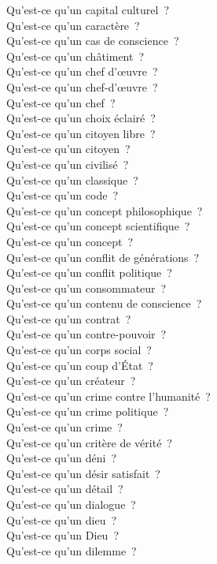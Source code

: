 \documentclass[a4paper,12pt]{article}
\begin{document}
Qu'est-ce qu'un capital culturel ? \\
Qu'est-ce qu'un caractère ? \\
Qu'est-ce qu'un cas de conscience ? \\
Qu'est-ce qu'un châtiment ? \\
Qu'est-ce qu'un chef d'œuvre ? \\
Qu'est-ce qu'un chef-d'œuvre ? \\
Qu'est-ce qu'un chef ? \\
Qu'est-ce qu'un choix éclairé ? \\
Qu'est-ce qu'un citoyen libre ? \\
Qu'est-ce qu'un citoyen ? \\
Qu'est-ce qu'un civilisé ? \\
Qu'est-ce qu'un classique ? \\
Qu'est-ce qu'un code ? \\
Qu'est-ce qu'un concept philosophique ? \\
Qu'est-ce qu'un concept scientifique ? \\
Qu'est-ce qu'un concept ? \\
Qu'est-ce qu'un conflit de générations ? \\
Qu'est-ce qu'un conflit politique ? \\
Qu'est-ce qu'un consommateur ? \\
Qu'est-ce qu'un contenu de conscience ? \\
Qu'est-ce qu'un contrat ? \\
Qu'est-ce qu'un contre-pouvoir ? \\
Qu'est-ce qu'un corps social ? \\
Qu'est-ce qu'un coup d'État ? \\
Qu'est-ce qu'un créateur ? \\
Qu'est-ce qu'un crime contre l'humanité ? \\
Qu'est-ce qu'un crime politique ? \\
Qu'est-ce qu'un crime ? \\
Qu'est-ce qu'un critère de vérité ? \\
Qu'est-ce qu'un déni ? \\
Qu'est-ce qu'un désir satisfait ? \\
Qu'est-ce qu'un détail ? \\
Qu'est-ce qu'un dialogue ? \\
Qu'est-ce qu'un dieu ? \\
Qu'est-ce qu'un Dieu ? \\
Qu'est-ce qu'un dilemme ? \\
\end{document}

